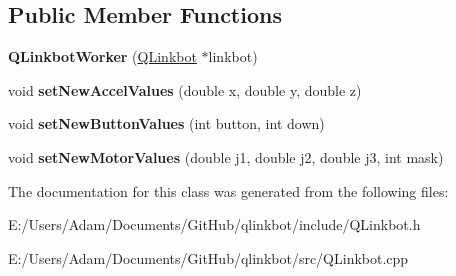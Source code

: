 \subsection*{Public Member Functions}
\begin{DoxyCompactItemize}
\item 
\hypertarget{class_q_linkbot_worker_add984ed6b839959ac0e58928f1511abf}{{\bfseries Q\-Linkbot\-Worker} (\hyperlink{class_q_linkbot}{Q\-Linkbot} $\ast$linkbot)}\label{class_q_linkbot_worker_add984ed6b839959ac0e58928f1511abf}

\item 
\hypertarget{class_q_linkbot_worker_ad4d5aa10b15dbac7118a466e8245bf29}{void {\bfseries set\-New\-Accel\-Values} (double x, double y, double z)}\label{class_q_linkbot_worker_ad4d5aa10b15dbac7118a466e8245bf29}

\item 
\hypertarget{class_q_linkbot_worker_ab19d62d665270906afee0e198c2b2541}{void {\bfseries set\-New\-Button\-Values} (int button, int down)}\label{class_q_linkbot_worker_ab19d62d665270906afee0e198c2b2541}

\item 
\hypertarget{class_q_linkbot_worker_af5dc38b873ce3aedfd96f10e098b2053}{void {\bfseries set\-New\-Motor\-Values} (double j1, double j2, double j3, int mask)}\label{class_q_linkbot_worker_af5dc38b873ce3aedfd96f10e098b2053}

\end{DoxyCompactItemize}


The documentation for this class was generated from the following files\-:\begin{DoxyCompactItemize}
\item 
E\-:/\-Users/\-Adam/\-Documents/\-Git\-Hub/qlinkbot/include/Q\-Linkbot.\-h\item 
E\-:/\-Users/\-Adam/\-Documents/\-Git\-Hub/qlinkbot/src/Q\-Linkbot.\-cpp\end{DoxyCompactItemize}
